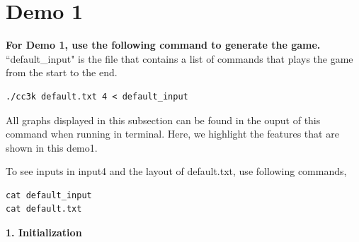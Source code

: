 \documentclass[11pt]{article}
\theoremstyle{plain}
\begin{document}
\newpage
\section{Demo 1}
\textbf{For Demo 1, use the following command to generate the game.}
``default\_input" is the file that contains a list of commands that plays the 
game from the start to the end.
\begin{lstlisting}
./cc3k default.txt 4 < default_input
\end{lstlisting}
All graphs displayed in this subsection can be found in the ouput of
this command when running in terminal. Here, we highlight the features that
are shown in this demo1. 

To see inputs in input4 and the layout of default.txt, use following commands,
\begin{lstlisting}
cat default_input
cat default.txt
\end{lstlisting}





\vspace{0.5 in}
\textbf{1. Initialization}
\end{document}
